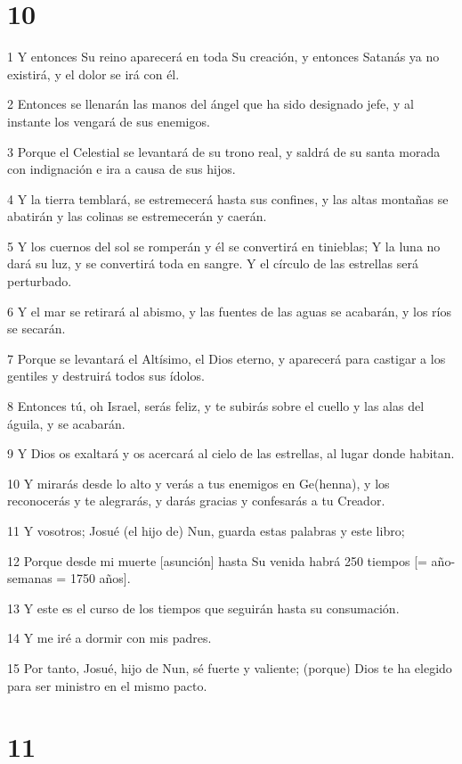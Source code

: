 \chapter{10}

\par 1 Y entonces Su reino aparecerá en toda Su creación, y entonces Satanás ya no existirá, y el dolor se irá con él.
\par 2 Entonces se llenarán las manos del ángel que ha sido designado jefe, y al instante los vengará de sus enemigos.
\par 3 Porque el Celestial se levantará de su trono real, y saldrá de su santa morada con indignación e ira a causa de sus hijos.
\par 4 Y la tierra temblará, se estremecerá hasta sus confines, y las altas montañas se abatirán y las colinas se estremecerán y caerán.
\par 5 Y los cuernos del sol se romperán y él se convertirá en tinieblas; Y la luna no dará su luz, y se convertirá toda en sangre. Y el círculo de las estrellas será perturbado.
\par 6 Y el mar se retirará al abismo, y las fuentes de las aguas se acabarán, y los ríos se secarán.
\par 7 Porque se levantará el Altísimo, el Dios eterno, y aparecerá para castigar a los gentiles y destruirá todos sus ídolos.
\par 8 Entonces tú, oh Israel, serás feliz, y te subirás sobre el cuello y las alas del águila, y se acabarán.
\par 9 Y Dios os exaltará y os acercará al cielo de las estrellas, al lugar donde habitan.
\par 10 Y mirarás desde lo alto y verás a tus enemigos en Ge(henna), y los reconocerás y te alegrarás, y darás gracias y confesarás a tu Creador.
\par 11 Y vosotros; Josué (el hijo de) Nun, guarda estas palabras y este libro;
\par 12 Porque desde mi muerte [asunción] hasta Su venida habrá 250 tiempos [= año-semanas = 1750 años].
\par 13 Y este es el curso de los tiempos que seguirán hasta su consumación.
\par 14 Y me iré a dormir con mis padres.
\par 15 Por tanto, Josué, hijo de Nun, sé fuerte y valiente; (porque) Dios te ha elegido para ser ministro en el mismo pacto.

\chapter{11}

